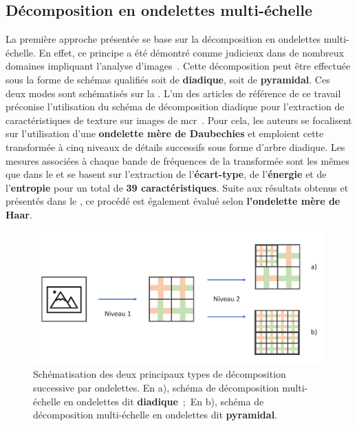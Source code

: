 \subsection{Décomposition en ondelettes multi-échelle}
La première approche présentée se base sur la décomposition en ondelettes multi-échelle. En effet, ce principe a été démontré comme judicieux dans de nombreux domaines impliquant l'analyse d'images~\cite{Carvalho2004}. Cette décomposition peut être effectuée sous la forme de schémas qualifiés soit de \textbf{diadique}, soit de \textbf{pyramidal}. Ces deux modes sont schématisés sur la . L'un des articles de référence de ce travail préconise l'utilisation du schéma de décomposition diadique pour l'extraction de caractéristiques de texture sur images de \gls{mcr}~\cite{Wiltgen2008}. Pour cela, les auteurs se focalisent sur l'utilisation d'une \textbf{ondelette mère de Daubechies} et emploient cette transformée à cinq niveaux de détails successifs sous forme d'arbre diadique. Les mesures associées à chaque bande de fréquences de la transformée sont les mêmes que dans le  et se basent sur l'extraction de l'\textbf{écart-type}, de l'\textbf{énergie} et de l'\textbf{entropie} pour un total de \textbf{39 caractéristiques}. Suite aux résultats obtenus et présentés dans le , ce procédé est également évalué selon \textbf{l'ondelette mère de Haar}.\par

\begin{figure}[H]
    \centering
    \includegraphics[width=\textwidth]{contents/chapter_6/resources/scheme_image_improvement_dwt_decomposition.pdf}
    \caption{Schématisation des deux principaux types de décomposition successive par ondelettes. En a), schéma de décomposition multi-échelle en ondelettes dit \textbf{diadique}~;~En b), schéma de décomposition multi-échelle en ondelettes dit \textbf{pyramidal}.}
    \label{fig:scheme_image_improvement_dwt_decomposition}
\end{figure}\par

